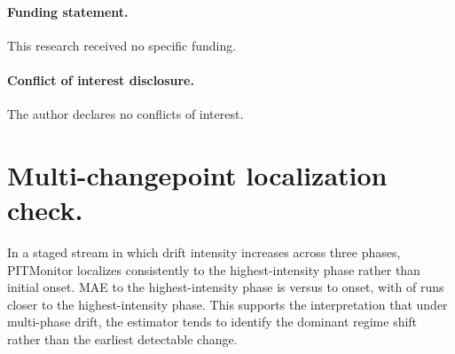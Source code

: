 \documentclass[ejsv2, noshowframe]{imsart}
\theoremstyle{plain}
\theoremstyle{definition}
\theoremstyle{remark}
\begin{document}
\paragraph{Funding statement.} This research received no specific funding.

\paragraph{Conflict of interest disclosure.} The author declares no conflicts of interest.

\appendix
\section{Multi-changepoint localization check.}
\label{app:additional_checks}
In a staged stream in which drift intensity increases across three phases, PITMonitor localizes consistently to the highest-intensity phase rather than initial onset. MAE to the highest-intensity phase is \addLocMAEMax{} versus \addLocMAEOnset{} to onset, with \addLocCloserMax{} of \addLocN{} runs closer to the highest-intensity phase. This supports the interpretation that under multi-phase drift, the estimator tends to identify the dominant regime shift rather than the earliest detectable change.



\end{document}
